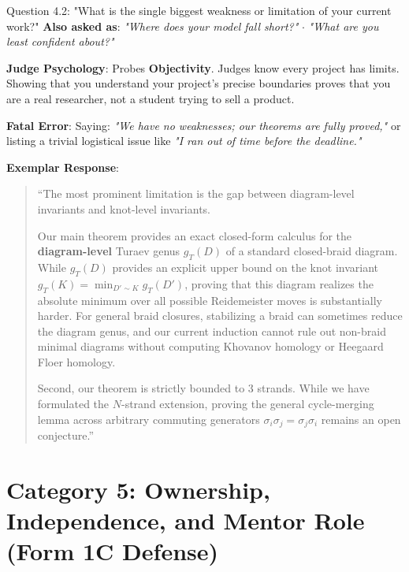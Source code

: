 \documentclass[11pt,letterpaper]{article}
\begin{document}
\vspace{1em}

\begin{questionbox}{Question 4.2: "What is the single biggest weakness or limitation of your current work?"}
\textbf{Also asked as}: \textit{"Where does your model fall short?"} $\cdot$ \textit{"What are you least confident about?"}
\end{questionbox}

\begin{strategybox}
\textbf{Judge Psychology}: Probes \textbf{Objectivity}. Judges know every project has limits. Showing that you understand your project's precise boundaries proves that you are a real researcher, not a student trying to sell a product.
\end{strategybox}

\begin{trapbox}
\textbf{Fatal Error}: Saying: \textit{"We have no weaknesses; our theorems are fully proved,"} or listing a trivial logistical issue like \textit{"I ran out of time before the deadline."}
\end{trapbox}

\begin{exemplarbox}
\textbf{Exemplar Response}:
\begin{quote}
``The most prominent limitation is the gap between diagram-level invariants and knot-level invariants. 

Our main theorem provides an exact closed-form calculus for the \textbf{diagram-level} Turaev genus $g_T(D)$ of a standard closed-braid diagram. While $g_T(D)$ provides an explicit upper bound on the knot invariant $g_T(K) = \min_{D' \sim K} g_T(D')$, proving that this diagram realizes the absolute minimum over all possible Reidemeister moves is substantially harder. For general braid closures, stabilizing a braid can sometimes reduce the diagram genus, and our current induction cannot rule out non-braid minimal diagrams without computing Khovanov homology or Heegaard Floer homology.

Second, our theorem is strictly bounded to 3 strands. While we have formulated the $N$-strand extension, proving the general cycle-merging lemma across arbitrary commuting generators $\sigma_i \sigma_j = \sigma_j \sigma_i$ remains an open conjecture.''
\end{quote}
\end{exemplarbox}

\newpage
\section{Category 5: Ownership, Independence, and Mentor Role (Form 1C Defense)}
\end{document}
